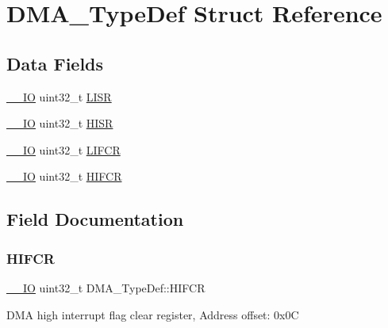 \hypertarget{struct_d_m_a___type_def}{}\section{D\+M\+A\+\_\+\+Type\+Def Struct Reference}
\label{struct_d_m_a___type_def}
\subsection*{Data Fields}
\begin{DoxyCompactItemize}
\item 
\hyperlink{core__sc300_8h_aec43007d9998a0a0e01faede4133d6be}{\+\_\+\+\_\+\+IO} uint32\+\_\+t \hyperlink{struct_d_m_a___type_def_aacb4a0977d281bc809cb5974e178bc2b}{L\+I\+SR}
\item 
\hyperlink{core__sc300_8h_aec43007d9998a0a0e01faede4133d6be}{\+\_\+\+\_\+\+IO} uint32\+\_\+t \hyperlink{struct_d_m_a___type_def_a01a90a5fcd6459e10b81c0ab737dd2e3}{H\+I\+SR}
\item 
\hyperlink{core__sc300_8h_aec43007d9998a0a0e01faede4133d6be}{\+\_\+\+\_\+\+IO} uint32\+\_\+t \hyperlink{struct_d_m_a___type_def_a11adb689c874d38b49fa44990323b653}{L\+I\+F\+CR}
\item 
\hyperlink{core__sc300_8h_aec43007d9998a0a0e01faede4133d6be}{\+\_\+\+\_\+\+IO} uint32\+\_\+t \hyperlink{struct_d_m_a___type_def_a1e4f50b935bab2520788ae936f2e55c1}{H\+I\+F\+CR}
\end{DoxyCompactItemize}


\subsection{Field Documentation}
\mbox{\label{struct_d_m_a___type_def_a1e4f50b935bab2520788ae936f2e55c1}} 
\subsubsection{\texorpdfstring{H\+I\+F\+CR}{HIFCR}}
{\footnotesize\ttfamily \hyperlink{core__sc300_8h_aec43007d9998a0a0e01faede4133d6be}{\+\_\+\+\_\+\+IO} uint32\+\_\+t D\+M\+A\+\_\+\+Type\+Def\+::\+H\+I\+F\+CR}

D\+MA high interrupt flag clear register, Address offset\+: 0x0C \mbox{\label{struct_d_m_a___type_def_a01a90a5fcd6459e10b81c0ab737dd2e3}} 
